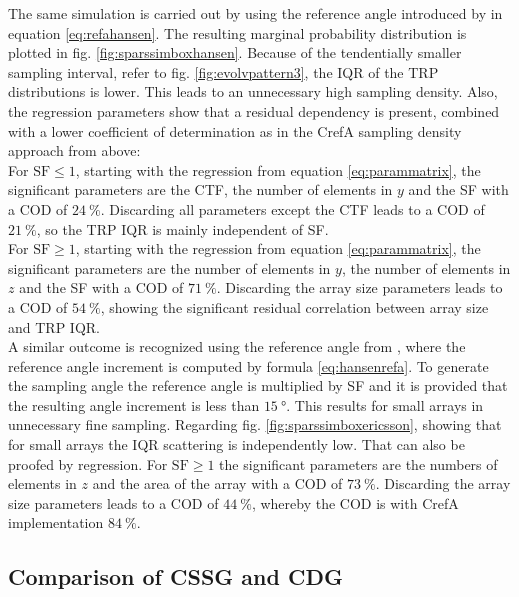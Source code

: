The same simulation is carried out by using the reference angle introduced by \cite{hansen} in equation \ref{eq:refahansen}. The resulting marginal probability distribution is plotted in fig. \ref{fig:sparssimboxhansen}. Because of the tendentially smaller sampling interval, refer to fig. \ref{fig:evolvpattern3}, the \ac{IQR} of the \ac{TRP} distributions is lower. This leads to an unnecessary high sampling density. Also, the regression parameters show that a residual dependency is present, combined with a lower coefficient of determination as in the \ac{CrefA} sampling density approach from above:\\
For $\text{SF}\le 1$, starting with the regression from equation \ref{eq:parammatrix}, the significant parameters are the \ac{CTF}, the number of elements in $y$ and the \ac{SF} with a \ac{COD} of $\SI{24}{\percent}$. Discarding all parameters except the \ac{CTF} leads to a \ac{COD} of $\SI{21}{\percent}$, so the \ac{TRP} \ac{IQR} is mainly independent of \ac{SF}.\\
For $\text{SF}\ge 1$, starting with the regression from equation \ref{eq:parammatrix}, the significant parameters are the number of elements in $y$, the number of elements in $z$ and the \ac{SF} with a \ac{COD} of $\SI{71}{\percent}$. Discarding the array size parameters leads to a \ac{COD} of $\SI{54}{\percent}$, showing the significant residual correlation between array size and \ac{TRP} \ac{IQR}.\\
A similar outcome is recognized using the reference angle from \cite{2018arXiv180310993F}, where the reference angle increment is computed by formula \ref{eq:hansenrefa}.
To generate the sampling angle the reference angle is multiplied by \ac{SF} and it is provided that the resulting angle increment is less than $\SI{15}{\degree}$.
This results for small arrays in unnecessary fine sampling.
Regarding fig. \ref{fig:sparssimboxericsson}, showing that for small arrays the \ac{IQR} scattering is independently low. That can also be proofed by regression. For $\text{SF}\ge 1$ the significant parameters are the numbers of elements in $z$ and the area of the array with a \ac{COD} of $\SI{73}{\percent}$. Discarding the array size parameters leads to a \ac{COD} of $\SI{44}{\percent}$, whereby the \ac{COD} is with \ac{CrefA} implementation $\SI{84}{\percent}$.

\subsection{Comparison of CSSG and CDG}

